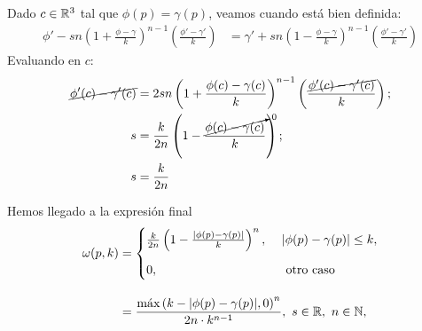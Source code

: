 Dado $c\in\mathbb{R}^3$ tal que $\phi(p) = \gamma(p)$, veamos cuando está bien definida:
\begin{align*}
    \phi' - sn\left(1+\frac{\phi-\gamma}{k}\right)^{n-1}\left(\frac{\phi'-\gamma'}{k}\right) &= \gamma' + sn\left(1-\frac{\phi-\gamma}{k}\right)^{n-1}\left(\frac{\phi'-\gamma'}{k}\right)
\end{align*}
Evaluando en $c$:
\begin{align*}
    \cancel{\phi'(c) -  \gamma'(c)} &= 2sn\left(1+\frac{\phi(c)-\gamma(c)}{k}\right)^{n-1}\left(\frac{\cancel{\phi'(c)-\gamma'(c)}}{k}\right);\\
    s &= \frac{k}{2n}\left(1-\frac{\cancelto{0}{\phi(c)-\gamma(c)}}{k}\right);\\
    s &= \frac{k}{2n}
\end{align*}
    


Hemos llegado a la expresión final
\begin{align*}
    \omega(p,k) &= \begin{cases}
        \frac{k}{2n}\left( 1-\frac{|\phi(p)-\gamma(p)|}{k} \right)^n,\ &|\phi(p)-\gamma(p)|\le k,\\[10pt]
        0,\ &\text{ otro caso }
    \end{cases}\\[10pt] &= \frac{\Max\left( k - |\phi(p) - \gamma(p)|, 0\right)^n}{2n\cdot k^{n-1}}  ,\ s\in\R,\ n\in\N,
\end{align*}

